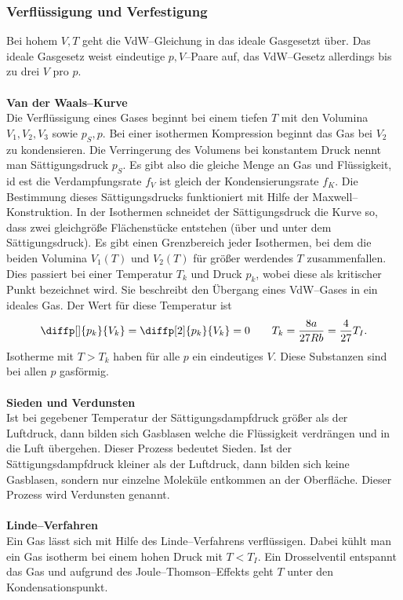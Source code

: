 \documentclass[a4paper,12pt]{article}
\begin{document}
\subsubsection{Verflüssigung und Verfestigung}
Bei hohem $V,T$ geht die VdW--Gleichung in das ideale Gasgesetzt über. Das ideale Gasgesetz weist eindeutige $p,V$--Paare auf, das VdW--Gesetz allerdings bis zu drei $V$ pro $p$.
\\\hfill\\\textbf{Van der Waals--Kurve}\\ 
Die Verflüssigung eines Gases beginnt bei einem tiefen $T$ mit den Volumina $V_1,V_2,V_3$ sowie $p_S,p$. Bei einer isothermen Kompression beginnt das Gas bei $V_2$ zu kondensieren. Die Verringerung des Volumens bei konstantem Druck nennt man Sättigungsdruck $p_S$. Es gibt also die gleiche Menge an Gas und Flüssigkeit, id est die Verdampfungsrate $f_V$ ist gleich der Kondensierungsrate $f_K$. Die Bestimmung dieses Sättigungsdrucks funktioniert mit Hilfe der Maxwell--Konstruktion. In der Isothermen schneidet der Sättigungsdruck die Kurve so, dass zwei gleichgröße Flächenstücke entstehen (über und unter dem Sättigungsdruck). Es gibt einen Grenzbereich jeder Isothermen, bei dem die beiden Volumina $V_1(T)$ und $V_2(T)$ für größer werdendes $T$ zusammenfallen. Dies passiert bei einer Temperatur $T_k$ und Druck $p_k$, wobei diese als kritischer Punkt bezeichnet wird. Sie beschreibt den Übergang eines VdW--Gases in ein ideales Gas. Der Wert für diese Temperatur ist
\[ 
        \diffp[]{p_k}{V_k}=\diffp[2]{p_k}{V_k}=0\qquad T_k=\dfrac{8a}{27Rb}=\dfrac{4}{27}T_I
.\] 
Isotherme mit $T>T_k$ haben für alle $p$ ein eindeutiges $V$. Diese Substanzen sind bei allen $p$ gasförmig.
\\\hfill\\\textbf{Sieden und Verdunsten}\\ 
Ist bei gegebener Temperatur der Sättigungsdampfdruck größer als der Luftdruck, dann bilden sich Gasblasen welche die Flüssigkeit verdrängen und in die Luft übergehen. Dieser Prozess bedeutet Sieden. Ist der Sättigungsdampfdruck kleiner als der Luftdruck, dann bilden sich keine Gasblasen, sondern nur einzelne Moleküle entkommen an der Oberfläche. Dieser Prozess wird Verdunsten genannt.
\\\hfill\\\textbf{Linde--Verfahren}\\ 
Ein Gas lässt sich mit Hilfe des Linde--Verfahrens verflüssigen. Dabei kühlt man ein Gas isotherm bei einem hohen Druck mit $T<T_I$. Ein Drosselventil entspannt das Gas und aufgrund des Joule--Thomson--Effekts geht $T$ unter den Kondensationspunkt.
\end{document}
